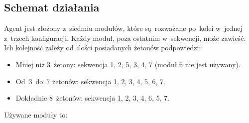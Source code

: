 \documentclass[declaration,shortabstract,inz]{iithesis}
\begin{document}
\subsection*{Schemat działania}

Agent jest złożony z~siedmiu modułów, które są~rozważane po~kolei w~jednej z~trzech konfiguracji. Każdy moduł, poza ostatnim w~sekwencji, może zawieść. Ich kolejność zależy od~ilości posiadanych żetonów podpowiedzi:

\begin{itemize}
	\item Mniej niż 3~żetony: sekwencja 1, 2, 5, 3, 4, 7 (moduł 6 nie jest używany).
	\item Od~3~do~7 żetonów: sekwencja 1, 2, 3, 4, 5, 6, 7.
	\item Dokładnie 8~żetonów: sekwencja 1, 2, 3, 4, 6, 5, 7.
\end{itemize}

\newpage

\noindent Używane moduły to:
\end{document}
